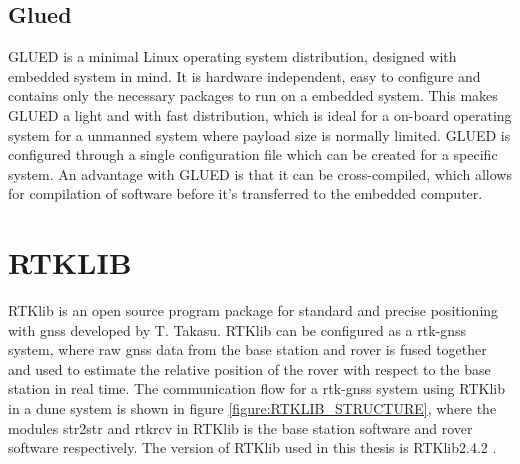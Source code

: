 \subsection{Glued}
GLUED is a minimal Linux operating system distribution, designed with embedded system in mind. It is hardware independent, easy to configure and contains only the necessary packages to run on a embedded system. This makes GLUED a light and with fast distribution, which is ideal for a on-board operating system for a unmanned system where payload size is normally limited. GLUED is configured through a single configuration file which can be created for a specific system. An advantage with GLUED is that it can be cross-compiled, which allows for compilation of software before it's transferred to the embedded computer.
\section{RTKLIB}\label{ss:Rtklib}
RTKlib \citep{takasu2009development} is an open source program package for standard and precise positioning with \gls{gnss} developed by T. Takasu. RTKlib can be configured as a \gls{rtk-gnss} system, where raw \gls{gnss} data from the base station and rover is fused together and used to estimate the relative position of the rover with respect to the base station in real time. The communication flow for a \gls{rtk-gnss} system using RTKlib in a \gls{dune} system is shown in figure \ref{figure:RTKLIB_STRUCTURE}, where the modules str2str and rtkrcv in RTKlib is the base station software and rover software respectively. The version of RTKlib used in this thesis is RTKlib2.4.2 \citep{Rtklib242}.

